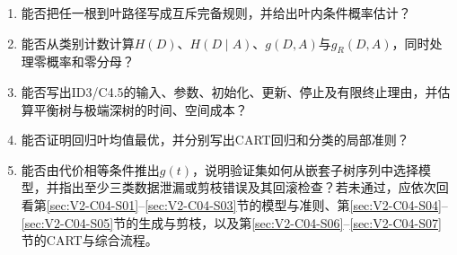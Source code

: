 \begin{SLCompactClosure}
\label{struct:V2-C04-CH36}

\label{struct:V2-C04-CH37}
\begin{selfcheckbox}
\begin{enumerate}[leftmargin=2.2em]
  \item 能否把任一根到叶路径写成互斥完备规则，并给出叶内条件概率估计？
  \item 能否从类别计数计算$H(D)$、$H(D\mid A)$、$g(D,A)$与$g_R(D,A)$，同时处理零概率和零分母？
  \item 能否写出ID3/C4.5的输入、参数、初始化、更新、停止及有限终止理由，并估算平衡树与极端深树的时间、空间成本？
  \item 能否证明回归叶均值最优，并分别写出CART回归和分类的局部准则？
  \item 能否由代价相等条件推出$g(t)$，说明验证集如何从嵌套子树序列中选择模型，并指出至少三类数据泄漏或剪枝错误及其回滚检查？若未通过，应依次回看第\ref{sec:V2-C04-S01}--\ref{sec:V2-C04-S03}节的模型与准则、第\ref{sec:V2-C04-S04}--\ref{sec:V2-C04-S05}节的生成与剪枝，以及第\ref{sec:V2-C04-S06}--\ref{sec:V2-C04-S07}节的CART与综合流程。
\end{enumerate}
\end{selfcheckbox}
\end{SLCompactClosure}

